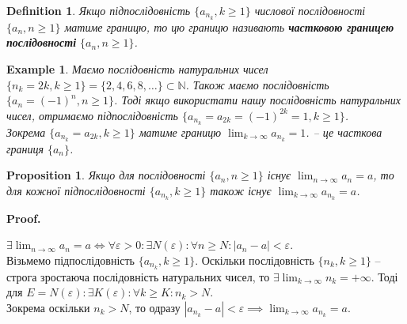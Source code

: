 \documentclass[a4paper, 14pt]{article}
\makeatletter
\def\qed{$\blacksquare$}
\theoremstyle{theoremdd}
\theoremstyle{theoremdd}
\newtheorem{definition}[theorem]{Definition}
\theoremstyle{theoremdd}
\theoremstyle{theoremdd}
\newtheorem{example}[theorem]{Example}
\theoremstyle{theoremdd}
\newtheorem{proposition}[theorem]{Proposition}
\theoremstyle{theoremdd}
\theoremstyle{theoremdd}
\theoremstyle{theoremdd}
\renewenvironment{proof}[1][Proof.\\]{\par
\pushQED{\hfill \qed}%
\normalfont \topsep6\p@\@plus6\p@\relax
\trivlist
\item\relax
{\bfseries
#1\@addpunct{.}}\hspace\labelsep\ignorespaces
}{%
\popQED\endtrivlist\@endpefalse
}
\makeatother
\begin{document}
	\begin{definition}
	Якщо підпослідовність $\{a_{n_k}, k \geq 1\}$ числової послідовності $\{a_n, n \geq 1\}$ матиме границю, то цю границю називають \textbf{частковою границею послідовності} $\{a_n, n \geq 1\}$.
	\end{definition}
	
	\begin{example} Маємо послідовність натуральних чисел
	$\{n_k = 2k, k \geq 1 \} = \{2,4,6,8,\dots \} \subset \mathbb{N}$.
	Також маємо послідовність $\{a_n = (-1)^n, n \geq 1\}$. Тоді якщо використати нашу послідовність натуральних чисел, отримаємо підпослідовність $\{a_{n_k} = a_{2k} = (-1)^{2k} = 1, k \geq 1\}$.\\
	Зокрема $\{a_{n_k} = a_{2k}, k \geq 1\}$ матиме границю $\displaystyle\lim_{k \to \infty} a_{n_k} = 1$. -- це часткова границя $\{a_n\}$.
	\end{example}
	
	\begin{proposition}
	Якщо для послідовності $\{a_n, n \geq 1\}$ існує $\displaystyle \lim_{n \to \infty} a_n = a$, то для кожної підпослідовності $\displaystyle \{a_{n_k}, k \geq 1\}$ також існує $\displaystyle\lim_{k \to \infty} a_{n_k} = a$.
	\end{proposition}
	
	\begin{proof}
	$\displaystyle \exists \lim_{n \to \infty} a_n = a \iff \forall \varepsilon > 0: \exists N(\varepsilon): \forall n \geq N: |a_n-a| < \varepsilon$.\\
	Візьмемо підпослідовність $\{a_{n_k}, k \geq 1\}$. Оскільки послідовність $\{n_k, k \geq 1\}$ -- строга зростаюча послідовність натуральних чисел, то $\exists \displaystyle \lim_{k \to \infty} n_k = +\infty$. Тоді для $E = N(\varepsilon): \exists K(\varepsilon): \forall k \geq K: n_k > N$.\\
	Зокрема оскільки $n_k > N$, то одразу $|a_{n_k} - a| < \varepsilon \implies \displaystyle \lim_{k \to \infty} a_{n_k} = a$.
	\end{proof}
	
	\iffalse %
	\begin{proposition}
	Якщо для кожної підпослідовності $\{a_{n_k}, k \geq 1\}: \exists \displaystyle\lim_{k \to \infty} a_{n_k} = a$, то для послідовності $\{a_n, n \geq 1\}: \exists \displaystyle\lim_{n \to \infty} a_n = a0$.\\
	\textit{Вказівка: зауважити, що $\{a_n, n \geq 1\}$ - це в якомусь сенсі підпослідовність $\{a_{n_k}, k \geq 1\}$, якщо $n_k = k$.}
	\end{proposition}
	\fi
	
\end{document}
